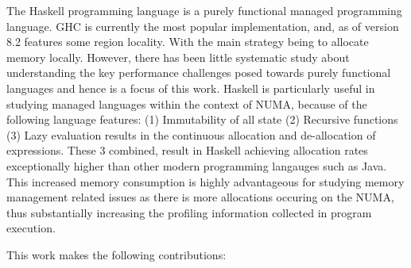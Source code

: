 \documentclass{paper}\usepackage{graphicx}
\begin{document}
The Haskell\cite{marlow2010haskell} programming language is a purely functional managed programming language. GHC is currently the most popular implementation, and, as of version 8.2 features some region locality. With the main strategy being to allocate memory locally. However, there has been little systematic study about understanding the key performance challenges posed towards purely functional languages and hence is a focus of this work. Haskell is particularly useful in studying managed languages within the context of NUMA, because of the following language features: (1) Immutability of all state (2) Recursive functions (3) Lazy evaluation results in the continuous allocation and de-allocation of expressions. These 3 combined, result in Haskell achieving allocation rates exceptionally higher than other modern programming langauges such as Java. This increased memory consumption is highly advantageous for studying memory management related issues as there is more allocations occuring on the NUMA, thus substantially increasing the profiling information collected in program execution.


This work makes the following contributions:
\end{document}
